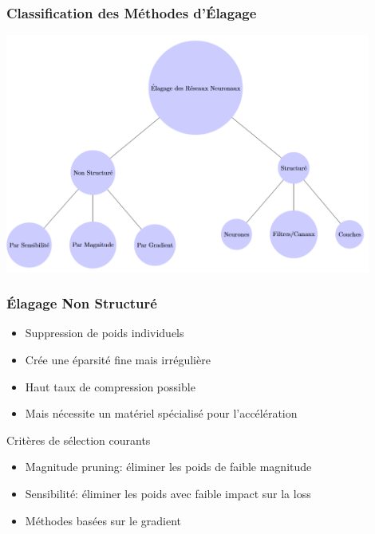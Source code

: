 \documentclass[10pt]{beamer}
\begin{document}
\begin{frame}
\frametitle{Classification des Méthodes d'Élagage}
\begin{center}
\includegraphics[width=0.9\textwidth]{pruning_taxonomy.png}
\end{center}
\end{frame}

\begin{frame}
\frametitle{Élagage Non Structuré}
\begin{itemize}
    \item Suppression de poids individuels
    \item Crée une éparsité fine mais irrégulière
    \item Haut taux de compression possible
    \item Mais nécessite un matériel spécialisé pour l'accélération
\end{itemize}

\begin{example}{Critères de sélection courants}
\begin{itemize}
    \item Magnitude pruning: éliminer les poids de faible magnitude
    \item Sensibilité: éliminer les poids avec faible impact sur la loss
    \item Méthodes basées sur le gradient
\end{itemize}
\end{example}
\end{frame}
\end{document}

